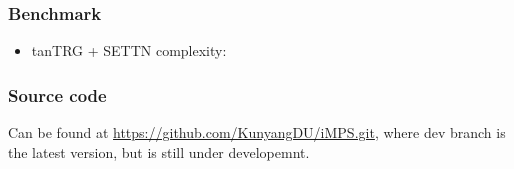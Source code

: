\documentclass{beamer}
\begin{document}
\begin{frame}
	\frametitle{Benchmark}
	\begin{itemize}
		\item tanTRG + SETTN complexity:
		\begin{figure}[H]
			\centering
			\subfigbottomskip=2pt
			\subfigcapskip=-5pt
		\end{figure}
	\end{itemize}
\end{frame}

\begin{frame}
	\frametitle{Source code}
	Can be found at \url{https://github.com/KunyangDU/iMPS.git}, where dev branch is the latest version, but is still under developemnt. 
\end{frame}
\end{document}
